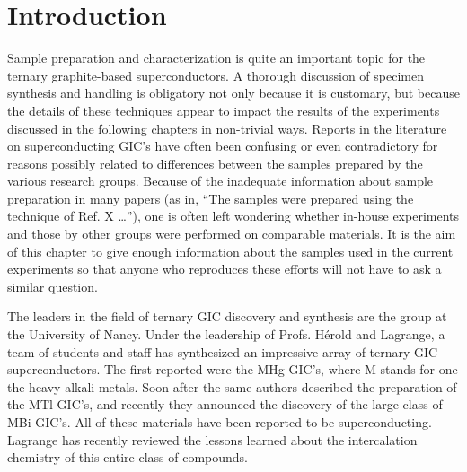 \section{Introduction}
\label{prepintro}

        Sample preparation and characterization is quite an important topic
for the ternary  graphite-based superconductors.  A  thorough discussion of
specimen  synthesis  and  handling  is obligatory  not  only because it  is
customary, but because the details of these techniques appear to impact the
results    of  the experiments   discussed   in the   following chapters in
non-trivial ways.  Reports in the  literature on superconducting GIC's have
often been confusing or even contradictory for reasons possibly  related to
differences between the samples prepared  by the  various research  groups.
Because  of  the inadequate information  about   sample preparation in many
papers  (as in, ``The samples  were prepared using the  technique of Ref. X
\ldots''), one is often left  wondering whether in-house experiments  and
those by other groups were  performed on  comparable materials.  It  is the
aim of this  chapter to give enough  information about the samples  used in
the current  experiments so that anyone  who reproduces  these efforts will
not have to ask a similar question.

        The leaders in the field of ternary GIC discovery and synthesis are
the group at the University  of  Nancy.    Under  the leadership of  Profs.
H\'erold and Lagrange,  a team  of  students and  staff has  synthesized an
impressive array of ternary  GIC superconductors.   The first reported were
the   MHg-GIC's,     where M   stands    for    one the     heavy    alkali
metals.\cite{lagrange80}   Soon  after  the  same   authors   described the
preparation  of   the MTl-GIC's,\cite{lagrange80,elmakrini80a} and recently
they      announced      the  discovery    of     the  large    class    of
MBi-GIC's.\cite{lagrange85} All of these materials have been reported to be
superconducting.    Lagrange\cite{lagrange87}   has   recently reviewed the
lessons learned about the intercalation chemistry of  this entire  class of
compounds.

